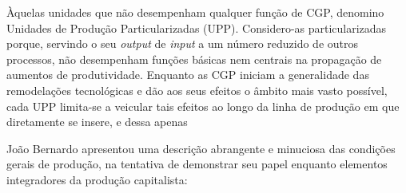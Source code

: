 \begin{citacao}
Àquelas unidades que não desempenham qualquer função de CGP, denomino Unidades de Produção Particularizadas (UPP). Considero-as particularizadas porque, servindo o seu \textit{output} de \textit{input} a um número reduzido de outros processos, não desempenham funções básicas nem centrais na propagação de aumentos de produtividade. Enquanto as CGP iniciam a generalidade das remodelações tecnológicas e dão aos seus efeitos o âmbito mais vasto possível, cada UPP limita-se a veicular tais efeitos ao longo da linha de produção em que diretamente se insere, e dessa apenas \cite[p.~158]{BERNARDO1991} 
\end{citacao}

João Bernardo apresentou uma descrição abrangente e minuciosa das condições gerais de produção, na tentativa de demonstrar seu papel enquanto elementos integradores da produção capitalista:

